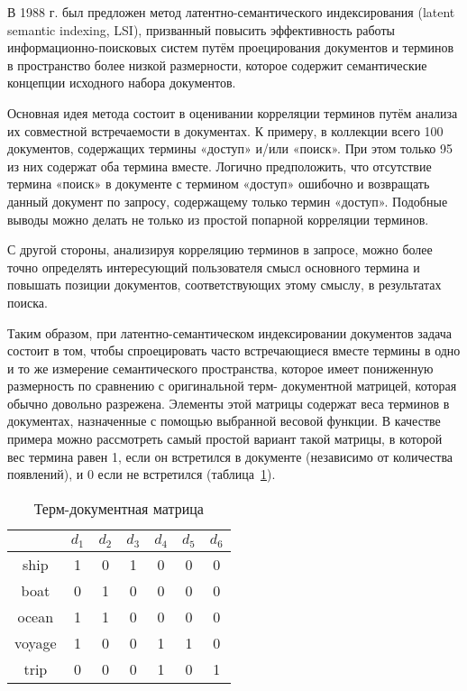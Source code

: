 В 1988 г. был предложен метод латентно-семантического индексирования (latent semantic indexing, LSI), призванный повысить эффективность работы информационно-поисковых систем путём проецирования документов и терминов в пространство более низкой размерности, которое содержит семантические концепции исходного набора документов. 

Основная идея метода состоит в оценивании корреляции терминов путём анализа их совместной встречаемости в документах. К примеру, в коллекции всего 100 документов, содержащих термины «доступ» и/или «поиск». При этом только 95 из них содержат оба термина вместе. Логично предположить, что отсутствие термина «поиск» в документе с термином «доступ» ошибочно и возвращать данный документ по запросу, содержащему только термин «доступ». Подобные выводы можно делать не только из простой попарной корреляции терминов. 

С другой стороны, анализируя корреляцию терминов в запросе, можно более точно определять интересующий пользователя смысл основного термина и повышать позиции документов, соответствующих этому смыслу, в результатах поиска.
 
Таким образом, при латентно-семантическом индексировании документов задача состоит в том, чтобы спроецировать часто встречающиеся вместе термины в одно и то же измерение семантического пространства, которое имеет пониженную размерность по сравнению с оригинальной терм- документной матрицей, которая обычно довольно разрежена. Элементы этой матрицы содержат веса терминов в документах, назначенные с помощью выбранной весовой функции. В качестве примера можно рассмотреть самый простой вариант такой матрицы, в которой вес термина равен 1, если он встретился в документе (независимо от количества появлений), и 0 если не встретился (таблица~\ref{td_matr}).
 
\begin{table}[h]
\caption{Терм-документная матрица}
\label{td_matr}
\centering
\begin{tabular}{c|cccccc}
 & $d_1$ & $d_2$ & $d_3$ & $d_4$ & $d_5$ & $d_6$ \\
\hline
ship & 1 & 0 & 1 & 0 & 0 & 0 \\
boat & 0 & 1 & 0 & 0 & 0 & 0 \\
ocean & 1 & 1 & 0 & 0 & 0 & 0 \\
voyage & 1 & 0 & 0 & 1 & 1 & 0 \\
trip & 0 & 0 & 0 & 1 & 0 & 1 \\
\end{tabular}
\end{table}

